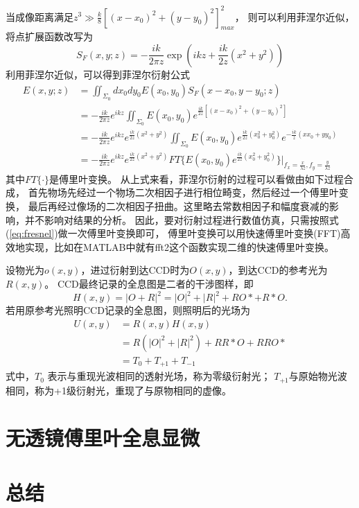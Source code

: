 \documentclass[11pt,a4paper]{article}
\begin{document}
当成像距离满足$z^3\gg\frac{k}{8}[(x-x_0)^2+(y-y_0)^2]_{max}^2$，
则可以利用菲涅尔近似，将点扩展函数改写为
\begin{equation}
S_F(x, y; z) =  - \frac{i k}{2 \pi z} \exp(i k z + \frac{i k}{ 2 z} (x^2+y^2))
\end{equation}
利用菲涅尔近似，可以得到菲涅尔衍射公式
\begin{equation}
\begin{split}
E(x, y; z) &=  \iint_{\Sigma_0}dx_0dy_0 E(x_0,y_0) S_F(x-x_0, y-y_0; z) \\
			&= -\frac{i k}{2 \pi z} e^{i k z} \iint_{\Sigma_0} E(x_0,y_0) e^{ \frac{i k}{ 2 z} [(x-x_0)^2+(y-y_0)^2] } \\
			&= -\frac{i k}{2 \pi z} e^{i k z} e^{\frac{i k }{2 z} (x^2+y^2)} \iint_{\Sigma_0} E(x_0,y_0) e^{ \frac{i k}{ 2 z} (x_0^2+y_0^2)} e^{- \frac{i k}{ z} (x x_0+y y_0)} \\
			&= -\frac{i k}{2 \pi z} e^{i k z} e^{\frac{i k }{2 z} (x^2+y^2)} FT\{E(x_0,y_0) e^{ \frac{i k}{ 2 z} (x_0^2+y_0^2)}\} \vert_{f_x = \frac{x}{\lambda z}, f_y = \frac{y}{\lambda z}}
\end{split}
\label{eq:fresnel}
\end{equation}
其中$FT\{\cdot\}$是傅里叶变换。
从上式来看，菲涅尔衍射的过程可以看做由如下过程合成，
首先物场先经过一个物场二次相因子进行相位畸变，然后经过一个傅里叶变换，
最后再经过像场的二次相因子扭曲。这里略去常数相因子和幅度衰减的影响，并不影响对结果的分析。
因此，要对衍射过程进行数值仿真，只需按照式(\ref{eq:fresnel})做一次傅里叶变换即可，
傅里叶变换可以用快速傅里叶变换(FFT)高效地实现，比如在MATLAB中就有fft2这个函数实现二维的快速傅里叶变换。

设物光为$o(x, y)$，进过衍射到达CCD时为$O(x,y)$，到达CCD的参考光为$R(x,y)$。
CCD最终记录的全息图是二者的干涉图样，即
\begin{equation}
H(x,y) = |O+R|^2 = |O|^2 + |R|^2 +RO*+R*O.
\end{equation}
若用原参考光照明CCD记录的全息图，则照明后的光场为
\begin{equation}
\begin{split}
U(x,y) &= R(x,y)H(x,y) \\
		&= R(|O|^2 + |R|^2) + RR*O + RRO* \\
		&= T_0 + T_{+1} + T_{-1}
\end{split}		
\end{equation}
式中，$T_0$ 表示与重现光波相同的透射光场，称为零级衍射光；
$T_{+1}$与原始物光波相同，称为+1级衍射光，重现了与原物相同的虚像。



\section{无透镜傅里叶全息显微}

\section{总结}




\end{document}
